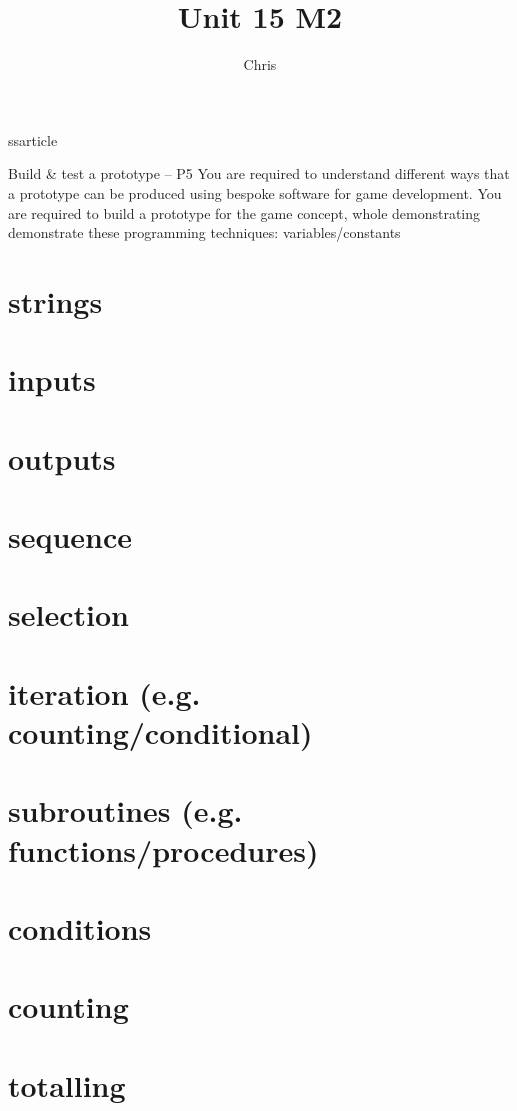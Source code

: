 ss{article}
\usepackage{graphicx}
\usepackage{hyperref}
\usepackage{titlesec}
\usepackage{geometry}

\title{Unit 15 M2}
\author{Chris}
\date{}



Build \& test a prototype – P5
You are required to understand different ways that a prototype can be produced using bespoke
software for game development.
You are required to build a prototype for the game concept, whole demonstrating demonstrate
these programming techniques:
variables/constants
\section{strings}

\section{inputs}
\section{outputs}
\section{sequence}
\section{selection}
\section{iteration (e.g. counting/conditional)}
\section{subroutines (e.g. functions/procedures)}
\section{conditions}
\section{counting}
\section{totalling}
